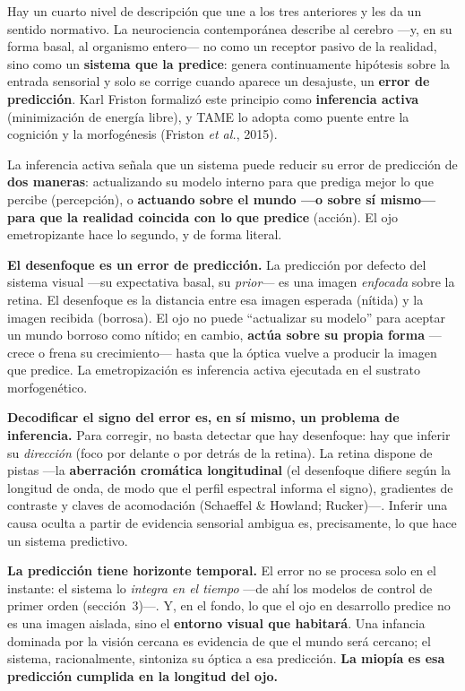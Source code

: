 \documentclass[11pt,a4paper]{article}
\begin{document}
Hay un cuarto nivel de descripción que une a los tres anteriores y les da un sentido normativo. La neurociencia contemporánea describe al cerebro ---y, en su forma basal, al organismo entero--- no como un receptor pasivo de la realidad, sino como un \textbf{sistema que la predice}: genera continuamente hipótesis sobre la entrada sensorial y solo se corrige cuando aparece un desajuste, un \textbf{error de predicción}. Karl Friston formalizó este principio como \textbf{inferencia activa} (minimización de energía libre), y TAME lo adopta como puente entre la cognición y la morfogénesis (Friston \emph{et al.}, 2015).

La inferencia activa señala que un sistema puede reducir su error de predicción de \textbf{dos maneras}: actualizando su modelo interno para que prediga mejor lo que percibe (percepción), o \textbf{actuando sobre el mundo ---o sobre sí mismo--- para que la realidad coincida con lo que predice} (acción). El ojo emetropizante hace lo segundo, y de forma literal.

\textbf{El desenfoque es un error de predicción.} La predicción por defecto del sistema visual ---su expectativa basal, su \emph{prior}--- es una imagen \emph{enfocada} sobre la retina. El desenfoque es la distancia entre esa imagen esperada (nítida) y la imagen recibida (borrosa). El ojo no puede \enquote{actualizar su modelo} para aceptar un mundo borroso como nítido; en cambio, \textbf{actúa sobre su propia forma} ---crece o frena su crecimiento--- hasta que la óptica vuelve a producir la imagen que predice. La emetropización es inferencia activa ejecutada en el sustrato morfogenético.

\textbf{Decodificar el signo del error es, en sí mismo, un problema de inferencia.} Para corregir, no basta detectar que hay desenfoque: hay que inferir su \emph{dirección} (foco por delante o por detrás de la retina). La retina dispone de pistas ---la \textbf{aberración cromática longitudinal} (el desenfoque difiere según la longitud de onda, de modo que el perfil espectral informa el signo), gradientes de contraste y claves de acomodación (Schaeffel \& Howland; Rucker)---. Inferir una causa oculta a partir de evidencia sensorial ambigua es, precisamente, lo que hace un sistema predictivo.

\textbf{La predicción tiene horizonte temporal.} El error no se procesa solo en el instante: el sistema lo \emph{integra en el tiempo} ---de ahí los modelos de control de primer orden (sección~3)---. Y, en el fondo, lo que el ojo en desarrollo predice no es una imagen aislada, sino el \textbf{entorno visual que habitará}. Una infancia dominada por la visión cercana es evidencia de que el mundo será cercano; el sistema, racionalmente, sintoniza su óptica a esa predicción. \textbf{La miopía es esa predicción cumplida en la longitud del ojo.}
\end{document}
